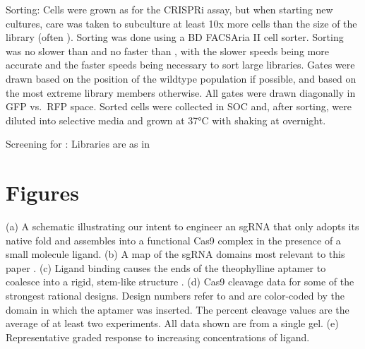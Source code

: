\documentclass[10pt,oneside]{article}
\begin{document}
Sorting: Cells were grown as for the CRISPRi assay, but when starting new  
cultures, care was taken to subculture at least 10x more cells than the size of 
the library (often ).  Sorting was done using a BD FACSAria II cell 
sorter.  Sorting was no slower than  and no faster than 
, with the slower speeds being more accurate and the faster speeds 
being necessary to sort large libraries.  Gates were drawn based on the 
position of the wildtype population if possible, and based on the most extreme 
library members otherwise.  All gates were drawn diagonally in GFP vs.\ RFP 
space.  Sorted cells were collected in  SOC and, after sorting, were 
diluted into selective media and grown at 37°C with shaking at  
overnight.

Screening for \ligrnaB{}: Libraries are as in 


\section{Figures}



 (a) A schematic illustrating our intent to engineer an sgRNA that only adopts 
 its native fold and assembles into a functional Cas9 complex in the presence 
 of a small molecule ligand.
 (b) A map of the sgRNA domains most relevant to this paper 
 \autocite{briner2014}.
 (c) Ligand binding causes the ends of the theophylline aptamer to coalesce 
 into a rigid, stem-like structure \autocite{zimmerman1997}.
 (d) \Invitro{} Cas9 cleavage data for some of the strongest rational designs.  
 Design numbers refer to  and are color-coded by 
 the domain in which the aptamer was inserted.  The percent cleavage values are 
 the average of at least two experiments.  All data shown are from a single 
 gel.
 (e) Representative graded response to increasing concentrations of ligand.


\end{document}
